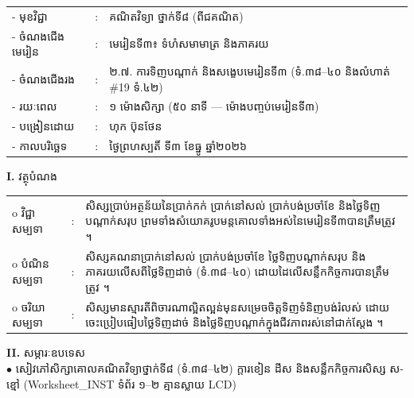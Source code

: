 \documentclass[a4paper,10pt]{article}
\newcommand{\wcirc}{{\CourierBullet\fontsize{9.5pt}{11pt}\selectfont o}}
\newcommand{\en}[1]{{\TimesEn #1}}
\begin{document}
{\renewcommand{\arraystretch}{0.98}
\hspace*{3.1cm}%
\begin{tabular}{@{}l l L{11.0cm}@{}}
  - \hspace{0.35cm} មុខវិជ្ជា & : & គណិតវិទ្យា ថ្នាក់ទី៨ (ពីជគណិត) \\
  - \hspace{0.35cm} ចំណងជើងមេរៀន & : & មេរៀនទី៣៖ ទំហំសមាមាត្រ និងភាគរយ \\
  - \hspace{0.35cm} ចំណងជើងរង & : & ២.៧. ការទិញបណ្ដាក់ និងសង្ខេបមេរៀនទី៣ (ទំ.៣៨–៤០ និងលំហាត់ \#19 ទំ.៤២) \\
  - \hspace{0.35cm} រយៈពេល & : & ១ ម៉ោងសិក្សា (៥០ នាទី — ម៉ោងបញ្ចប់មេរៀនទី៣) \\
  - \hspace{0.35cm} បង្រៀនដោយ & : & ហុក ប៊ុនថែន \\
  - \hspace{0.35cm} កាលបរិច្ឆេទ & : & ថ្ងៃព្រហស្បតិ៍ ទី៣ ខែធ្នូ ឆ្នាំ២០២៦ \\
\end{tabular}

\vspace{2pt}

\textbf{I.} {\muol វត្ថុបំណង}\\[1pt]
\hspace*{0.55cm}%
\begin{tabular}{@{}l l L{14.2cm}@{}}
  \wcirc \hspace{0.25cm} វិជ្ជាសម្បទា & : & សិស្សប្រាប់អត្ថន័យនៃប្រាក់កក់ ប្រាក់នៅសល់ ប្រាក់បង់ប្រចាំខែ និងថ្លៃទិញបណ្ដាក់សរុប ព្រមទាំងសំយោគរូបមន្តគោលទាំងអស់នៃមេរៀនទី៣បានត្រឹមត្រូវ ។ \\
  \wcirc \hspace{0.25cm} បំណិនសម្បទា & : & សិស្សគណនាប្រាក់នៅសល់ ប្រាក់បង់ប្រចាំខែ ថ្លៃទិញបណ្ដាក់សរុប និងភាគរយលើសពីថ្លៃទិញដាច់ (ទំ.៣៨–៤០) ដោយដៃលើសន្លឹកកិច្ចការបានត្រឹមត្រូវ ។ \\
  \wcirc \hspace{0.25cm} ចរិយាសម្បទា & : & សិស្សមានស្មារតីពិចារណាល្អិតល្អន់មុនសម្រេចចិត្តទិញទំនិញបង់រំលស់ ដោយចេះប្រៀបធៀបថ្លៃទិញដាច់ និងថ្លៃទិញបណ្ដាក់ក្នុងជីវភាពរស់នៅជាក់ស្ដែង ។ \\
\end{tabular}

\vspace{2pt}

\textbf{II.} {\muol សម្ភារៈឧបទេស}\\[1pt]
\hspace*{0.55cm}$\bullet$ \hspace{0.35cm} សៀវភៅសិក្សាគោលគណិតវិទ្យាថ្នាក់ទី៨ (ទំ.៣៨–៤២) ក្ដារខៀន ដីស និងសន្លឹកកិច្ចការសិស្ស ស-ខ្មៅ (\en{Worksheet\_INST} ទំព័រ ១–២ គ្មានស្លាយ \en{LCD})

}
\end{document}
